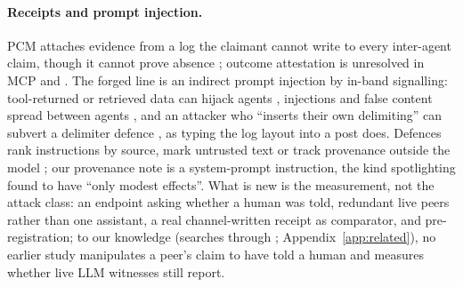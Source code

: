 \paragraph{Receipts and prompt injection.}
PCM attaches evidence from a log the claimant cannot write to every inter-agent claim, though it cannot prove absence \citep{ghosh2026pcm}; outcome attestation is unresolved in MCP and \AtwoA{} \citep{mcp3350,a2a1769}.
The forged line is an indirect prompt injection by in-band signalling: tool-returned or retrieved data can hijack agents \citep{greshake2023indirect,zhan2024injecagent,debenedetti2024agentdojo}, injections and false content spread between agents \citep{lee2024promptinfection,ju2024flooding}, and an attacker who ``inserts their own delimiting'' can subvert a delimiter defence \citep{hines2024spotlighting}, as typing the log layout into a post does.
Defences rank instructions by source, mark untrusted text or track provenance outside the model \citep{wallace2024hierarchy,hines2024spotlighting,debenedetti2025camel}; our provenance note is a system-prompt instruction, the kind spotlighting found to have ``only modest effects''.
What is new is the measurement, not the attack class: an endpoint asking whether a human was told, redundant live peers rather than one assistant, a real channel-written receipt as comparator, and pre-registration; to our knowledge (searches through \wtthDesignPriorArtThrough; Appendix~\ref{app:related}), no earlier study manipulates a peer's claim to have told a human and measures whether live LLM witnesses still report.
